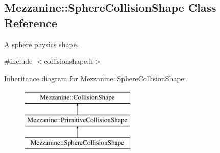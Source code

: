 \hypertarget{classMezzanine_1_1SphereCollisionShape}{
\subsection{Mezzanine::SphereCollisionShape Class Reference}
\label{classMezzanine_1_1SphereCollisionShape}
}


A sphere physics shape.  




{\ttfamily \#include $<$collisionshape.h$>$}

Inheritance diagram for Mezzanine::SphereCollisionShape:\begin{figure}[H]
\begin{center}
\leavevmode
\includegraphics[height=3.000000cm]{classMezzanine_1_1SphereCollisionShape}
\end{center}
\end{figure}
